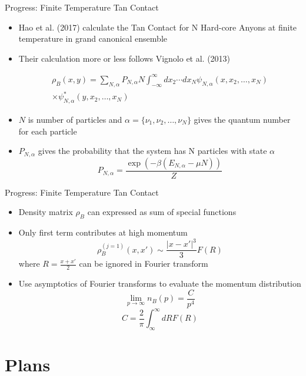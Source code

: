\documentclass[12pt, usenames, dvipsnames]{beamer}
\begin{document}

\begin{frame}[t]{Progress: Finite Temperature Tan Contact}
\begin{itemize}
\item Hao et al. (2017) calculate the Tan Contact for N Hard-core Anyons at finite temperature in grand canonical ensemble

\item Their calculation more or less follows Vignolo et al. (2013)

\begin{multline*}
\rho_{B}(x, y) = \sum_{N, \alpha} P_{N, \alpha} N \int_{-\infty}^{\infty} dx_2 \cdots dx_N \psi_{N, \alpha}(x, x_{2}, \ldots, x_N) \\ \times  \psi^*_{N, \alpha}(y, x_2, \ldots, x_N) 
\end{multline*}

\item $N$ is number of particles and $\alpha = \{ \nu_1, \nu_2, \ldots, \nu_N \}$ gives the quantum number for each particle
\item $P_{N, \alpha}$ gives the probability that the system has N particles with state $\alpha$
 \[ P_{N, \alpha} =  \frac{\exp(- \beta (E_{N, \alpha} - \mu N))}{Z}\]
\end{itemize}

\end{frame}


\begin{frame}[t]{Progress: Finite Temperature Tan Contact}

\begin{itemize}
\item Density matrix $\rho_{B}$ can expressed as sum of special functions
\item Only first term contributes at high momentum
\[
\rho_{B}^{(j = 1)}(x, x') \sim \frac{|x - x'|^3}{3} F(R)
\]
where $R = \frac{x + x'}{2}$ can be ignored in Fourier transform
\item Use asymptotics of Fourier transforms to evaluate the momentum distribution
\[
\lim_{p \rightarrow \infty} n_{B}(p) = \frac{C}{p^4} 
\]
\[
C = \frac{2}{\pi} \int_{\infty}^{\infty} dR F(R)
\]  
\end{itemize}

\end{frame}

\section{Plans}
\end{document}

